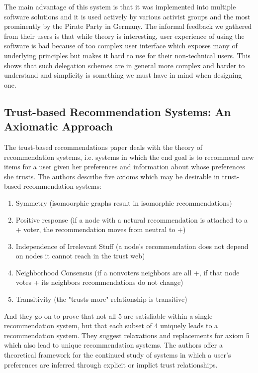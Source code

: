 \documentclass[a4paper]{acm_proc_article-sp}
\begin{document}
The main advantage of this system is that it was implemented into multiple software solutions and it is used actively by
various activist groups and the most prominently by the Pirate Party in Germany. The informal feedback we gathered from
their users is that while theory is interesting, user experience of using the software is bad because of too complex
user interface which exposes many of underlying principles but makes it hard to use for their non-technical users.
This shows that such delegation schemes are in general more complex and harder to understand and simplicity is something we
must have in mind when designing one.

\subsection{Trust-based Recommendation Systems: An Axiomatic Approach}

The trust-based recommendations paper deals with the theory of recommendation systems, i.e. systems in which the end goal is to recommend new items for a user given her preferences and information about whose preferences she trusts.  The authors describe five axioms which may be desirable in trust-based recommendation systems:
\begin{enumerate}
	\item Symmetry (isomoorphic graphs result in isomorphic recommendations)
	\item Positive response (if a node with a netural recommendation is attached to a + voter, the recommendation moves from neutral to +)
	\item Independence of Irrelevant Stuff (a node's recommendation does not depend on nodes it cannot reach in the trust web)
	\item Neighborhood Consensus (if a nonvoters neighbors are all +, if that node votes + its neighbors recommendations do not change)
	\item Transitivity (the "trusts more" relationship is transitive)
\end{enumerate}
And they go on to prove that not all 5 are satisfiable within a single recommendation system, but that each subset of 4 uniquely leads to a recommendation system.  They suggest relaxations and replacements for axiom 5 which also lead to unique recommendation systems.  The authors offer a theoretical framework for the continued study of systems in which a user's preferences are inferred through explicit or implict trust relationships.
\end{document}
